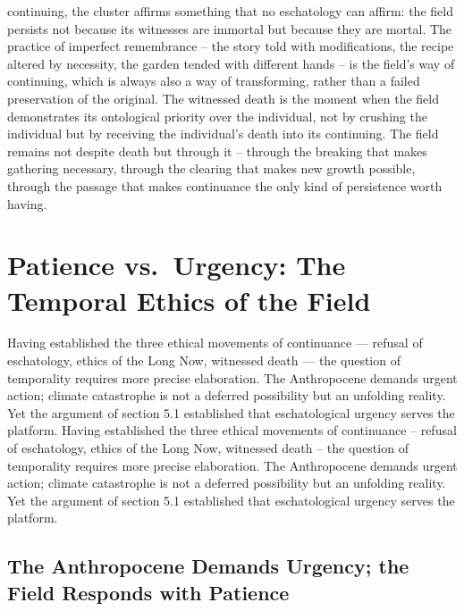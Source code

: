 continuing, the cluster affirms something that no eschatology can affirm: the field persists not because its witnesses are immortal but because they are mortal. The practice of imperfect remembrance – the story told with modifications, the recipe altered by necessity, the garden tended with different hands – is the field’s way of continuing, which is always also a way of transforming, rather than a failed preservation of the original. The witnessed death is the moment when the field demonstrates its ontological priority over the individual, not by crushing the individual but by receiving the individual’s death into its continuing. The field remains not despite death but through it – through the breaking that makes gathering necessary, through the clearing that makes new growth possible, through the passage that makes continuance the only kind of persistence worth having.

\section{Patience vs.\ Urgency: The Temporal Ethics of the Field}

Having established the three ethical movements of continuance --- refusal of eschatology, ethics of the Long Now, witnessed death --- the question of temporality requires more precise elaboration. The Anthropocene demands urgent action; climate catastrophe is not a deferred possibility but an unfolding reality. Yet the argument of section 5.1 established that eschatological urgency serves the platform. Having established the three ethical movements of continuance – refusal of eschatology, ethics of the Long Now, witnessed death – the question of temporality requires more precise elaboration. The Anthropocene demands urgent action; climate catastrophe is not a deferred possibility but an unfolding reality. Yet the argument of section 5.1 established that eschatological urgency serves the platform.

\subsection{The Anthropocene Demands Urgency; the Field Responds with Patience}

